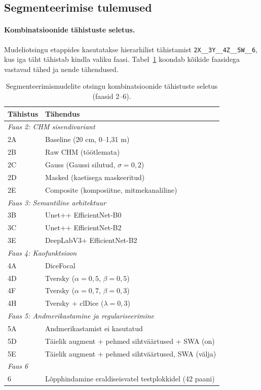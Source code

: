 \subsection{Segmenteerimise tulemused}
\label{segmenteerimise-tulemused}

\paragraph{Kombinatsioonide tähistuste seletus.}

Mudeliotsingu etappides kasutatakse hierarhilist tähistamist \texttt{2X\_\_3Y\_\_4Z\_\_5W\_\_6}, kus iga täht tähistab kindla valiku faasi. Tabel~\ref{tab:seg-notation-legend} koondab kõikide faasidega vastavad tähed ja nende tähendused.

\begin{table}[h!]
\centering
\caption{Segmenteerimismudelite otsingu kombinatsioonide tähistuste seletus (faasid 2--6).}
\label{tab:seg-notation-legend}
\begin{tabular}{ll}
\hline
\textbf{Tähistus} & \textbf{Tähendus} \\
\hline
\multicolumn{2}{l}{\textit{Faas 2: CHM sisendivariant}} \\
\hline
2A & Baseline (20 cm, 0--1,31 m) \\
2B & Raw CHM (töötlemata) \\
2C & Gauss (Gaussi silutud, $\sigma=0,2$) \\
2D & Masked (kaetisega maskeeritud) \\
2E & Composite (komposiitne, mitmekanaliline) \\
\hline
\multicolumn{2}{l}{\textit{Faas 3: Semantiline arhitektuur}} \\
\hline
3B & Unet++ EfficientNet-B0 \\
3C & Unet++ EfficientNet-B2 \\
3E & DeepLabV3+ EfficientNet-B2 \\
\hline
\multicolumn{2}{l}{\textit{Faas 4: Kaofunktsioon}} \\
\hline
4A & DiceFocal \\
4D & Tversky ($\alpha=0{,}5$, $\beta=0{,}5$) \\
4F & Tversky ($\alpha=0{,}7$, $\beta=0{,}3$) \\
4H & Tversky + clDice ($\lambda=0{,}3$) \\
\hline
\multicolumn{2}{l}{\textit{Faas 5: Andmerikastamine ja regulariseerimine}} \\
\hline
5A & Andmerikastamist ei kasutatud \\
5D & Täielik augment + pehmed sihtväärtused + SWA (on) \\
5E & Täielik augment + pehmed sihtväärtused, SWA (välja) \\
\hline
\multicolumn{2}{l}{\textit{Faas 6}} \\
\hline
6 & Lõpphindamine eraldiseisvatel testplokkidel (42 paani) \\
\hline
\end{tabular}
\end{table}

